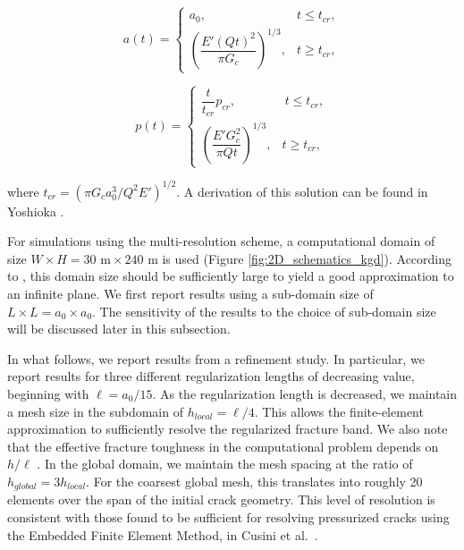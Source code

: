 \begin{equation}\label{length_solution_tkgd}
    a(t) =     \begin{cases}
      a_0, &  t \le t_{cr},  \\
      \left(\dfrac{E'(Qt)^2}{\pi G_c}\right)^{1/3}, &  t \ge t_{cr}, 
    \end{cases}
\end{equation}

\begin{equation}\label{pressure_solution_tkgd}
    p(t) =     \begin{cases}
      \dfrac{t}{t_{cr}}p_{cr}, &  \ t \le t_{cr},\\
      \left(\dfrac{E'G_c^2}{\pi Qt}\right)^{1/3}, &  t \ge t_{cr},
    \end{cases}
\end{equation}

where $t_{cr} =(\pi G_c a_0^3/Q^2E')^{1/2}$. A derivation of this solution can be found in Yoshioka \cite{yoshioka2020crack}.

For simulations using the multi-resolution scheme, a computational domain of size $W\times H = 30\text{ m} \times 240\text{ m}$ is used (Figure \ref{fig:2D_schematics_kgd}). According to \cite{isida1973analysis}, this domain size should be sufficiently large to yield a good approximation to an infinite plane.  We first report results using a sub-domain size of $L \times L = a_0 \times a_0$.   The sensitivity of the results to the choice of sub-domain size will be discussed later in this subsection.  

In what follows, we report results from a refinement study.  In particular, we report results for three different regularization lengths of decreasing value, beginning with $\ell = a_0/15$.  As the regularization length is decreased, we maintain a mesh size in the subdomain of $h_{local} = \ell/{4}$.  This allows the finite-element approximation to sufficiently resolve the regularized fracture band. We also note that the effective fracture toughness in the computational problem depends on $h/\ell$ \cite{yoshioka2020crack}.  In the global domain, we maintain the mesh spacing at the ratio of $h_{global} = 3h_{local}$.  For the coarsest global mesh, this translates into roughly 20 elements over the span of the initial crack geometry.  This level of resolution is consistent with those found to be sufficient for resolving pressurized cracks using the Embedded Finite Element Method, in Cusini et al.\ \cite{cusini2021simulation}.

